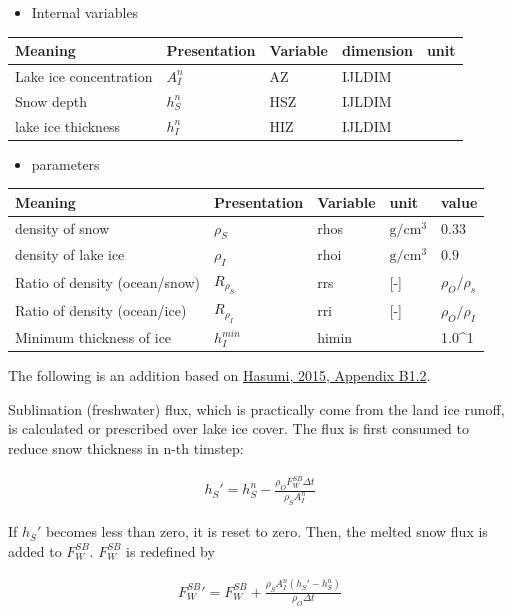 \begin{itemize}
\tightlist
\item
  Internal variables
\end{itemize}

\setlength\LTleft{0pt}\setlength\LTright{0pt}\begin{longtable}[]{@{}lllll@{}}
\toprule\relax
Meaning & Presentation & Variable & dimension & unit\tabularnewline
\midrule\relax
\endhead
Lake ice concentration & \(A_I^n\) & AZ & IJLDIM &\tabularnewline
Snow depth & \(h_S^n\) & HSZ & IJLDIM &\tabularnewline
lake ice thickness & \(h_I^n\) & HIZ & IJLDIM &\tabularnewline
\bottomrule
\end{longtable}

\begin{itemize}
\tightlist
\item
  parameters
\end{itemize}

\setlength\LTleft{0pt}\setlength\LTright{0pt}\begin{longtable}[]{@{}lllll@{}}
\toprule\relax
Meaning & Presentation & Variable & unit & value\tabularnewline
\midrule\relax
\endhead
density of snow & \(\rho_S\) & rhos & \(\mathrm{g/cm^3}\) &
\(0.33\)\tabularnewline
density of lake ice & \(\rho_I\) & rhoi & \(\mathrm{g/cm^3}\) &
\(0.9\)\tabularnewline
Ratio of density (ocean/snow) & \(R_{\rho_S}\) & rrs & {[}-{]} &
\(\rho_O/\rho_s\)\tabularnewline
Ratio of density (ocean/ice) & \(R_{\rho_I}\) & rri & {[}-{]} &
\(\rho_O/\rho_I\)\tabularnewline
Minimum thickness of ice & \(h_I^{min}\) & himin & &
1.0\times 10\^{}1\tabularnewline
\bottomrule
\end{longtable}

The following is an addition based on
\href{https://ccsr.aori.u-tokyo.ac.jp/~hasumi/COCO/coco4.pdf}{Hasumi,
2015, Appendix B1.2}.

Sublimation (freshwater) flux, which is practically come from the land
ice runoff, is calculated or prescribed over lake ice cover. The flux is
first consumed to reduce snow thickness in n-th timstep:

\begin{eqnarray}
    h_S' = h_S^n -  \frac{\rho_O  F_W^{SB}\Delta t}{\rho_S A_I^n}
\end{eqnarray}

If \(h_S'\) becomes less than zero, it is reset to zero. Then, the
melted snow flux is added to \(F_W^{SB}\). \(F_W^{SB}\) is redefined by

\begin{eqnarray}
    F_W^{SB}{'} = F_W^{SB} + \frac{\rho_S A_I^n (h_S' - h_S^n)}{\rho_O\Delta t}
\end{eqnarray}

